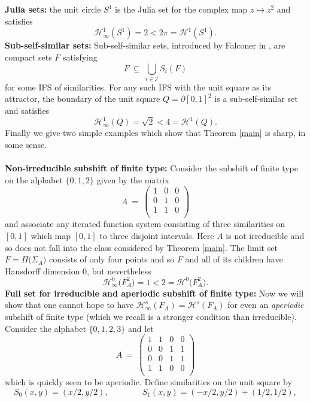 \documentclass[11pt,english,british]{article}
\numberwithin{equation}{section}
\begin{document}
\\ \\
\textbf{Julia sets:}  the unit circle $S^1$ is the Julia set for the complex map $z \mapsto z^2$ and satisfies
\[
\mathcal{H}_\infty^1 (S^1) = 2 <  2 \pi =  \mathcal{H}^1 (S^1).
\]
\textbf{Sub-self-similar sets:}  Sub-self-similar sets, introduced by Falconer in \cite{subselfsim}, are compact sets $F$ satisfying
\[
F \  \subseteq  \  \bigcup_{i \in \mathcal{I}} S_i(F)
\]
for some IFS of similarities.  For any such IFS with the unit square as its attractor, the boundary of the unit square $Q = \partial [0,1]^2$ is a sub-self-similar set and satisfies
\[
\mathcal{H}_\infty^1 (Q) = \sqrt{2} <  4  =  \mathcal{H}^1 (Q).
\]
Finally we give two simple examples which show that Theorem \ref{main} is sharp, in some sense. 
\\ \\
\textbf{Non-irreducible subshift of finite type:} Consider the subshift of finite type on the alphabet $\{0,1,2\}$ given by the matrix
\[
A \ = \ \left ( \begin{array}{ccc}
1 & 0 & 0 \\ 
0 & 1 & 0 \\ 
1 & 1 & 0 \\ 
\end{array} \right ) 
\]
and associate any iterated function system consisting of three similarities on $[0,1]$ which map $[0,1]$ to three disjoint intervals.  Here $A$ is not irreducible and so does not fall into the class considered by Theorem \ref{main}.  The limit set $F = \Pi\big(\Sigma_A\big)$ consists of only four points and so $F$ and all of its children have Hausdorff dimension 0, but nevertheless
\[
\mathcal{H}_\infty^0 \big(F_A^2\big) =  1 <  2 =  \mathcal{H}^0 \big(F_A^2\big).
\]
\textbf{Full set for irreducible and aperiodic subshift of finite type:} Now we will show that one cannot hope to have $\mathcal{H}_\infty^s (F_A)  =  \mathcal{H}^s (F_A)$ for even an \emph{aperiodic} subshift of finite type (which we recall is a stronger condition than irreducible).  Consider the alphabet $\{0,1,2,3\}$ and let
\[
A \ = \ \left ( \begin{array}{cccc}
1 & 1 & 0 & 0 \\ 
0 & 0 & 1 & 1 \\  
0 & 0 & 1 & 1 \\ 
1 & 1 & 0 & 0 \\
\end{array} \right ) 
\]
which is quickly seen to be aperiodic.  Define similarities on the unit square by
\[
S_0(x,y) = (x/2,y/2), \qquad \qquad S_1(x,y) = (-x/2,y/2) + (1/2, 1/2), 
\]
\end{document}
